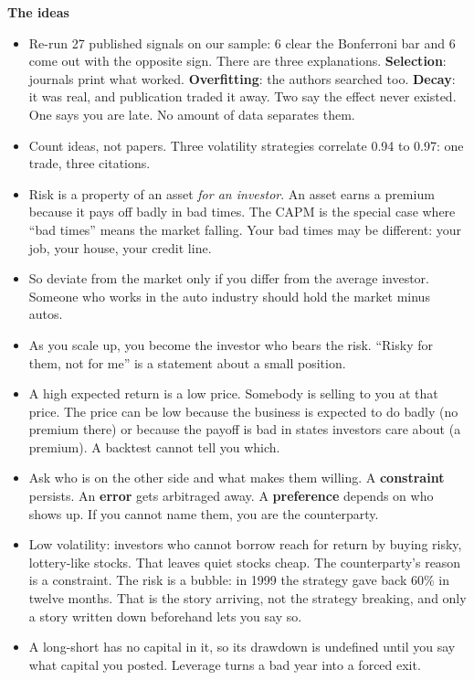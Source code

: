 \documentclass[11pt]{article}
\newcounter{ex}[section]
\newcommand{\head}[1]{\par\medskip\textbf{#1}\par}
\begin{document}
\head{The ideas}
\begin{itemize}
\item Re-run 27 published signals on our sample: 6 clear the Bonferroni bar and 6 come out with the opposite sign.
There are three explanations. \textbf{Selection}: journals print what worked. \textbf{Overfitting}: the authors
searched too. \textbf{Decay}: it was real, and publication traded it away. Two say the effect never existed. One says you
are late. No amount of data separates them.
\item Count ideas, not papers. Three volatility strategies correlate 0.94 to 0.97: one trade, three citations.
\item Risk is a property of an asset \emph{for an investor}. An asset earns a premium because it pays off badly in bad
times. The CAPM is the special case where ``bad times'' means the market falling. Your bad times may be different: your
job, your house, your credit line.
\item So deviate from the market only if you differ from the average investor. Someone who works in the auto industry
should hold the market minus autos.
\item As you scale up, you become the investor who bears the risk. ``Risky for them, not for me'' is a statement about a
small position.
\item A high expected return is a low price. Somebody is selling to you at that price. The price can be low because the
business is expected to do badly (no premium there) or because the payoff is bad in states investors care about (a
premium). A backtest cannot tell you which.
\item Ask who is on the other side and what makes them willing. A \textbf{constraint} persists. An \textbf{error} gets
arbitraged away. A \textbf{preference} depends on who shows up. If you cannot name them, you are the counterparty.
\item Low volatility: investors who cannot borrow reach for return by buying risky, lottery-like stocks. That leaves
quiet stocks cheap. The counterparty's reason is a constraint. The risk is a bubble: in 1999 the strategy gave back 60\%
in twelve months. That is the story arriving, not the strategy breaking, and only a story written down beforehand lets
you say so.
\item A long-short has no capital in it, so its drawdown is undefined until you say what capital you posted. Leverage
turns a bad year into a forced exit.
\end{itemize}
\end{document}
